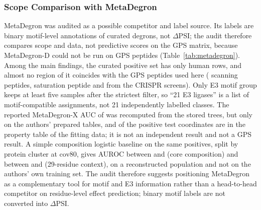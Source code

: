 \subsubsection{Scope Comparison with MetaDegron}
MetaDegron \citep{zheng2024} was audited as a possible competitor and label source. Its
labels are binary motif-level annotations of curated degrons, not $\Delta$PSI; the audit therefore compares scope
and data, not predictive scores on the GPS matrix, because MetaDegron-D could not be run on GPS peptides
(Table~\ref{tab:metadegron}). Among the main findings, the curated positive set has only \nMdHuman{} human rows, and
almost no region of it coincides with the GPS peptides used here (\nMdOvScan{} scanning peptides, \nMdOvSat{} saturation peptide
and \nMdOvCrispr{} from the CRISPR screens). Only \nMdEThreeStrict{} E3 motif group keeps at least five samples after the strictest filter, so ``21 E3
ligases'' is a list of motif-compatible assignments, not 21 independently labelled classes. The reported
MetaDegron-X AUC of \nMdAuc{} was recomputed from the stored trees, but only on the authors' prepared tables, and \nMdInProps{} of the \nMdTestPos{}
positive test coordinates are in the property table of the fitting data; it is not an independent result and not a
GPS result. A simple composition logistic baseline on the same positives, split by protein cluster at cov80,
gives AUROC between \nCompLo{} and \nCompHi{} (core composition) and between \nCtxLo{} and \nCtxHi{} (29-residue
context), on a reconstructed population and not on the authors' own training set. The audit therefore suggests positioning MetaDegron as a complementary tool for motif and E3 information rather than a
head-to-head competitor on residue-level effect prediction; binary motif labels are not converted into $\Delta$PSI.

\begin{table}[htbp]
  \centering
  \caption{Audit of the MetaDegron data and overlap with the data of this thesis}\label{tab:metadegron}
  
\end{table}



